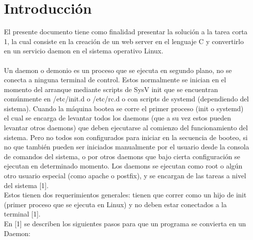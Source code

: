 \documentclass[conference]{IEEEtran}
\begin{document}
\section{Introducción}
El presente documento tiene como finalidad presentar la solución a la tarea corta 1, la cual consiste en la creación de un web server en el lenguaje C y convertirlo en un servicio daemon en el sistema operativo Linux.
\\\\Un daemon o demonio es un proceso que se ejecuta en segundo plano, no se conecta a ninguna terminal de control. Estos normalmente se inician en el momento del arranque mediante scripts de SysV init que se encuentran comúnmente en /etc/init.d o /etc/rc.d o con scripts de systemd (dependiendo del sistema). Cuando la máquina bootea se corre el primer proceso (init o systemd) el cual se encarga de levantar todos los daemons (que a su vez estos pueden levantar otros daemons) que deben ejecutarse al comienzo del funcionamiento del sistema. Pero no todos son configurados para iniciar en la secuencia de booteo, si no que también pueden ser iniciados manualmente por el usuario desde la consola de comandos del sistema, o por otros daemons que bajo cierta configuración se ejecutan en determinado momento. Los daemons se ejecutan como root o algún otro usuario especial (como apache o postfix), y se encargan de las tareas a nivel del sistema [1].
\\Estos tienen dos requerimientos generales: tienen que correr como un hijo de init (primer proceso que se ejecuta en Linux) y no deben estar conectados a la terminal [1].
\\En [1] se describen los siguientes pasos para que un programa se convierta en un Daemon:
\end{document}
